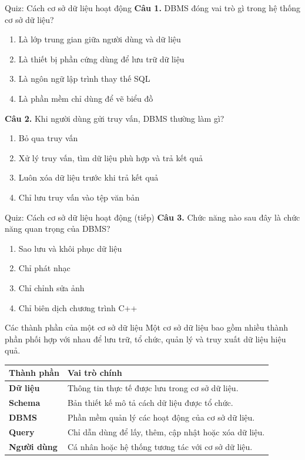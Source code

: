 ﻿\documentclass[aspectratio=169,11pt]{beamer}
\newcommand{\tightlist}{\setlength{\itemsep}{2pt}\setlength{\parskip}{0pt}}
\newcommand{\qoption}[2]{\item[#1.] #2}
\begin{document}
\begin{frame}{Quiz: Cách cơ sở dữ liệu hoạt động}
\small
\textbf{Câu 1.} DBMS đóng vai trò gì trong hệ thống cơ sở dữ liệu?
\begin{enumerate}
\tightlist
  \qoption{A}{Là lớp trung gian giữa người dùng và dữ liệu}
  \qoption{B}{Là thiết bị phần cứng dùng để lưu trữ dữ liệu}
  \qoption{C}{Là ngôn ngữ lập trình thay thế SQL}
  \qoption{D}{Là phần mềm chỉ dùng để vẽ biểu đồ}
\end{enumerate}

\textbf{Câu 2.} Khi người dùng gửi truy vấn, DBMS thường làm gì?
\begin{enumerate}
\tightlist
  \qoption{A}{Bỏ qua truy vấn}
  \qoption{B}{Xử lý truy vấn, tìm dữ liệu phù hợp và trả kết quả}
  \qoption{C}{Luôn xóa dữ liệu trước khi trả kết quả}
  \qoption{D}{Chỉ lưu truy vấn vào tệp văn bản}
\end{enumerate}
\end{frame}

\begin{frame}{Quiz: Cách cơ sở dữ liệu hoạt động (tiếp)}
\small
\textbf{Câu 3.} Chức năng nào sau đây là chức năng quan trọng của DBMS?
\begin{enumerate}
\tightlist
  \qoption{A}{Sao lưu và khôi phục dữ liệu}
  \qoption{B}{Chỉ phát nhạc}
  \qoption{C}{Chỉ chỉnh sửa ảnh}
  \qoption{D}{Chỉ biên dịch chương trình C++}
\end{enumerate}
\end{frame}


\begin{frame}{Các thành phần của một cơ sở dữ liệu}
\small
Một cơ sở dữ liệu bao gồm nhiều thành phần phối hợp với nhau để lưu trữ, tổ chức, quản lý và truy xuất dữ liệu hiệu quả.

\vspace{0.25cm}
\begin{tabularx}{\textwidth}{>{\bfseries}p{} X}
\toprule
Thành phần & Vai trò chính \\
\midrule
Dữ liệu & Thông tin thực tế được lưu trong cơ sở dữ liệu. \\
Schema & Bản thiết kế mô tả cách dữ liệu được tổ chức. \\
DBMS & Phần mềm quản lý các hoạt động của cơ sở dữ liệu. \\
Query & Chỉ dẫn dùng để lấy, thêm, cập nhật hoặc xóa dữ liệu. \\
Người dùng & Cá nhân hoặc hệ thống tương tác với cơ sở dữ liệu. \\
\bottomrule
\end{tabularx}
\end{frame}
\end{document}
